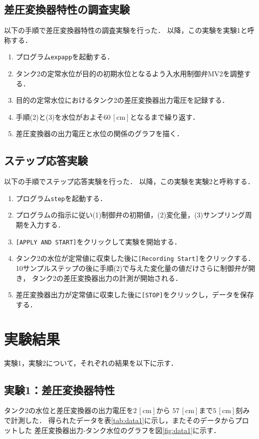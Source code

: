 \documentclass[11pt,a4paper]{jsarticle}
\begin{document}
  \subsection{差圧変換器特性の調査実験}
    以下の手順で差圧変換器特性の調査実験を行った．
    以降，この実験を実験1と呼称する．
    \begin{enumerate}
      \item プログラム\texttt{expapp}を起動する．
      \item タンク2の定常水位が目的の初期水位となるよう入水用制御弁MV2を調整する．
      \item 目的の定常水位におけるタンク2の差圧変換器出力電圧を記録する．
      \item 手順(2)と(3)を水位がおよそ$60 \, \mathrm{[cm]}$となるまで繰り返す．
      \item 差圧変換器の出力電圧と水位の関係のグラフを描く．
    \end{enumerate}
  
  \subsection{ステップ応答実験}
    以下の手順でステップ応答実験を行った．
    以降，この実験を実験2と呼称する．
    \begin{enumerate}
      \item プログラム\texttt{step}を起動する．
      \item プログラムの指示に従い(1)制御弁の初期値，(2)変化量，(3)サンプリング周期を入力する．
      \item \texttt{[APPLY AND START]}をクリックして実験を開始する．
      \item タンク2の水位が定常値に収束した後に\texttt{[Recording Start]}をクリックする．
            10サンプルステップの後に手順(2)で与えた変化量の値だけさらに制御弁が開き，
            タンク2の差圧変換器出力の計測が開始される．
      \item 差圧変換器出力が定常値に収束した後に\texttt{[STOP]}をクリックし，データを保存する．
    \end{enumerate}

\section{実験結果}
  \setcounter{equation}{0}
  \setcounter{figure}{0}
  \setcounter{table}{0}

  実験1，実験2について，それぞれの結果を以下に示す．

  \subsection{実験1：差圧変換器特性}
    タンク2の水位と差圧変換器の出力電圧を$2 \,\mathrm{[cm]}$から
    $57 \,\mathrm{[cm]}$まで$5 \,\mathrm{[cm]}$刻みで計測した．
    得られたデータを表\ref{tab:data1}に示し，またそのデータからプロットした
    差圧変換器出力-タンク水位のグラフを図\ref{fig:data1}に示す．
\end{document}
